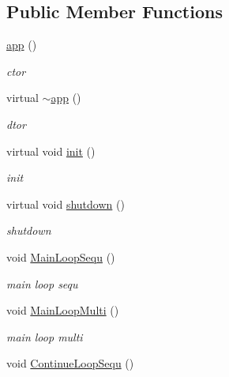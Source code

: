 \subsection*{Public Member Functions}
\begin{DoxyCompactItemize}
\item 
\hyperlink{classnebula_1_1framework_1_1app_a6647b29dd741f88e1d8a6d0246935ffd}{app} ()
\begin{DoxyCompactList}\small\item\em ctor \item\end{DoxyCompactList}\item 
virtual \hyperlink{classnebula_1_1framework_1_1app_a0c5adf8d5fbc01a2b9d339aca9df63a7}{$\sim$app} ()
\begin{DoxyCompactList}\small\item\em dtor \item\end{DoxyCompactList}\item 
virtual void \hyperlink{classnebula_1_1framework_1_1app_a8ec897736c54f5ee32f4b9827ac403fa}{init} ()
\begin{DoxyCompactList}\small\item\em init \item\end{DoxyCompactList}\item 
virtual void \hyperlink{classnebula_1_1framework_1_1app_ac1d87e5eff52129168d740a50b09bd9d}{shutdown} ()
\begin{DoxyCompactList}\small\item\em shutdown \item\end{DoxyCompactList}\item 
void \hyperlink{classnebula_1_1framework_1_1app_a1ef5e4a11817d1c6856060b60cd622ef}{MainLoopSequ} ()
\begin{DoxyCompactList}\small\item\em main loop sequ \item\end{DoxyCompactList}\item 
void \hyperlink{classnebula_1_1framework_1_1app_a154c3febb4ff453b5363c7036f259441}{MainLoopMulti} ()
\begin{DoxyCompactList}\small\item\em main loop multi \item\end{DoxyCompactList}\item 
void \hyperlink{classnebula_1_1framework_1_1app_a0f69a7ae0f734eb2f61468c9d0101862}{ContinueLoopSequ} ()

\end{DoxyCompactItemize}
